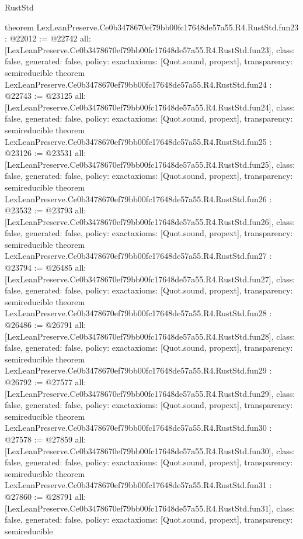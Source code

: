 \begin{lexlean}{RustStd}
\begin{coremodule}
{}
theorem LexLeanPreserve.Ce0b3478670ef79bb00fc17648de57a55.R4.RustStd.fun23 : @22012 := @22742 {
  all: [LexLeanPreserve.Ce0b3478670ef79bb00fc17648de57a55.R4.RustStd.fun23],
  class: false,
  generated: false,
  policy: exact{axioms: [Quot.sound, propext]},
  transparency: semireducible
}
theorem LexLeanPreserve.Ce0b3478670ef79bb00fc17648de57a55.R4.RustStd.fun24 : @22743 := @23125 {
  all: [LexLeanPreserve.Ce0b3478670ef79bb00fc17648de57a55.R4.RustStd.fun24],
  class: false,
  generated: false,
  policy: exact{axioms: [Quot.sound, propext]},
  transparency: semireducible
}
theorem LexLeanPreserve.Ce0b3478670ef79bb00fc17648de57a55.R4.RustStd.fun25 : @23126 := @23531 {
  all: [LexLeanPreserve.Ce0b3478670ef79bb00fc17648de57a55.R4.RustStd.fun25],
  class: false,
  generated: false,
  policy: exact{axioms: [Quot.sound, propext]},
  transparency: semireducible
}
theorem LexLeanPreserve.Ce0b3478670ef79bb00fc17648de57a55.R4.RustStd.fun26 : @23532 := @23793 {
  all: [LexLeanPreserve.Ce0b3478670ef79bb00fc17648de57a55.R4.RustStd.fun26],
  class: false,
  generated: false,
  policy: exact{axioms: [Quot.sound, propext]},
  transparency: semireducible
}
theorem LexLeanPreserve.Ce0b3478670ef79bb00fc17648de57a55.R4.RustStd.fun27 : @23794 := @26485 {
  all: [LexLeanPreserve.Ce0b3478670ef79bb00fc17648de57a55.R4.RustStd.fun27],
  class: false,
  generated: false,
  policy: exact{axioms: [Quot.sound, propext]},
  transparency: semireducible
}
theorem LexLeanPreserve.Ce0b3478670ef79bb00fc17648de57a55.R4.RustStd.fun28 : @26486 := @26791 {
  all: [LexLeanPreserve.Ce0b3478670ef79bb00fc17648de57a55.R4.RustStd.fun28],
  class: false,
  generated: false,
  policy: exact{axioms: [Quot.sound, propext]},
  transparency: semireducible
}
theorem LexLeanPreserve.Ce0b3478670ef79bb00fc17648de57a55.R4.RustStd.fun29 : @26792 := @27577 {
  all: [LexLeanPreserve.Ce0b3478670ef79bb00fc17648de57a55.R4.RustStd.fun29],
  class: false,
  generated: false,
  policy: exact{axioms: [Quot.sound, propext]},
  transparency: semireducible
}
theorem LexLeanPreserve.Ce0b3478670ef79bb00fc17648de57a55.R4.RustStd.fun30 : @27578 := @27859 {
  all: [LexLeanPreserve.Ce0b3478670ef79bb00fc17648de57a55.R4.RustStd.fun30],
  class: false,
  generated: false,
  policy: exact{axioms: [Quot.sound, propext]},
  transparency: semireducible
}
theorem LexLeanPreserve.Ce0b3478670ef79bb00fc17648de57a55.R4.RustStd.fun31 : @27860 := @28791 {
  all: [LexLeanPreserve.Ce0b3478670ef79bb00fc17648de57a55.R4.RustStd.fun31],
  class: false,
  generated: false,
  policy: exact{axioms: [Quot.sound, propext]},
  transparency: semireducible
}
\end{coremodule}
\end{lexlean}
